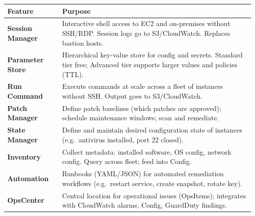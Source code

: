 \begin{comparebox}[title={SSM features}]
\begin{tabular}{@{}p{3.8cm}p{8cm}@{}}
\toprule
\textbf{Feature} & \textbf{Purpose} \\
\midrule
\textbf{Session Manager}        & Interactive shell access to EC2 and on-premises without SSH/RDP.
                                  Session logs go to S3/CloudWatch. Replaces bastion hosts. \\[4pt]
\textbf{Parameter Store}        & Hierarchical key-value store for config and secrets.
                                  Standard tier free; Advanced tier supports larger values and policies (TTL). \\[4pt]
\textbf{Run Command}            & Execute commands at scale across a fleet of instances without SSH.
                                  Output goes to S3/CloudWatch. \\[4pt]
\textbf{Patch Manager}          & Define patch baselines (which patches are approved); schedule
                                  maintenance windows; scan and remediate. \\[4pt]
\textbf{State Manager}          & Define and maintain desired configuration state of instances
                                  (e.g.\ antivirus installed, port 22 closed). \\[4pt]
\textbf{Inventory}              & Collect metadata: installed software, OS config, network config.
                                  Query across fleet; feed into Config. \\[4pt]
\textbf{Automation}             & Runbooks (YAML/JSON) for automated remediation workflows
                                  (e.g.\ restart service, create snapshot, rotate key). \\[4pt]
\textbf{OpsCenter}              & Central location for operational issues (OpsItems); integrates
                                  with CloudWatch alarms, Config, GuardDuty findings. \\
\bottomrule
\end{tabular}
\end{comparebox}

